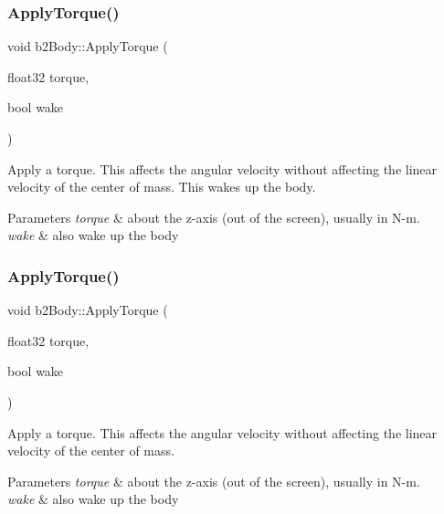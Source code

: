 \subsubsection{\texorpdfstring{Apply\+Torque()}{ApplyTorque()}\hspace{0.1cm}{\footnotesize\ttfamily [1/2]}}
{\footnotesize\ttfamily void b2\+Body\+::\+Apply\+Torque (\begin{DoxyParamCaption}\item[{float32}]{torque,  }\item[{bool}]{wake }\end{DoxyParamCaption})\hspace{0.3cm}{\ttfamily [inline]}}

Apply a torque. This affects the angular velocity without affecting the linear velocity of the center of mass. This wakes up the body. 
\begin{DoxyParams}{Parameters}
{\em torque} & about the z-\/axis (out of the screen), usually in N-\/m. \\
\hline
{\em wake} & also wake up the body \\
\hline
\end{DoxyParams}
\mbox{\label{classb2Body_a54a354447ac3b4cc224c8327a5abc0e8}} 
\subsubsection{\texorpdfstring{Apply\+Torque()}{ApplyTorque()}\hspace{0.1cm}{\footnotesize\ttfamily [2/2]}}
{\footnotesize\ttfamily void b2\+Body\+::\+Apply\+Torque (\begin{DoxyParamCaption}\item[{float32}]{torque,  }\item[{bool}]{wake }\end{DoxyParamCaption})}

Apply a torque. This affects the angular velocity without affecting the linear velocity of the center of mass. 
\begin{DoxyParams}{Parameters}
{\em torque} & about the z-\/axis (out of the screen), usually in N-\/m. \\
\hline
{\em wake} & also wake up the body \\
\hline
\end{DoxyParams}
\mbox{\label{classb2Body_aa4892301e9b9d62ede5e93dad1743894}} 

